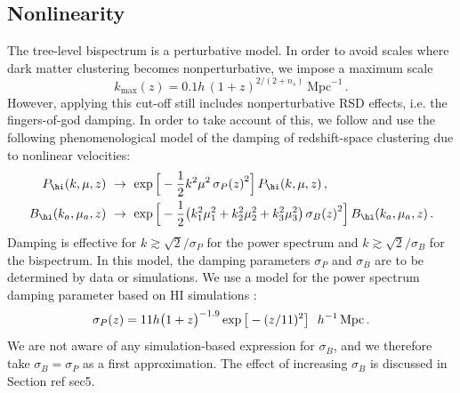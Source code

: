 \subsection{Nonlinearity}
%
The tree-level bispectrum is a perturbative model. In order to avoid scales where dark matter clustering becomes nonperturbative, we impose a maximum scale \cite{Maartens:2019yhx}
\begin{equation} \label{eq:snrkmax}
k_{\mathrm{max}}(z) = 0.1h\,(1+z)^{2/(2+n_s)}~\mathrm{Mpc}^{-1}\,.
\end{equation}
However, applying this cut-off still includes nonperturbative RSD effects, i.e. the fingers-of-god damping. In order to take account of this, we follow \cite{Karagiannis:2018jdt,Yankelevich:2018uaz,Maartens:2019yhx} and use the following phenomenological model of the damping of redshift-space clustering due to nonlinear velocities:
\begin{align}
 P_{\hi}(k,\mu,z) & ~\to~   \exp\Big[-\frac{1}{2}{k^2\mu^2\,{\sigma_{P}(z)}^{2}}\Big]\,P_{\hi}(k,\mu,z)
 \,, \label{e2.10}\\
 B_{\hi}(k_a,\mu_a,z) & ~\to~  \exp\Big[-\frac{1}{2}{\left( k_{1}^{2}\mu_{1}^{2}+k_{2}^{2}\mu_{2}^{2}+k_{3}^{2}\mu_{3}^{2}\right){\sigma_{B}(z)}^{2}}\Big]\,B_{\hi}(k_a,\mu_a,z)
 \,. \label{e2.11}
\end{align}
Damping is effective for $k\gtrsim \sqrt{2}/\sigma_P$ for the power spectrum and  $k\gtrsim \sqrt{2}/\sigma_B$ for the bispectrum.
In this model, the damping parameters $\sigma_P$ and $\sigma_B$ are  to be determined by data or simulations.
We use a model for the power spectrum damping parameter based on HI simulations \cite{Sarkar:2019ojl}:
\begin{equation}
\sigma_{P}(z) = 11h\big(1+z\big)^{-1.9}\exp{\big[-(z/11)^{2}\big]}~~h^{-1}\,\mathrm{Mpc}\,. \label{e2.12}  \\
\end{equation}
We are not aware of any simulation-based expression for $\sigma_B$, and we therefore take $\sigma_B=\sigma_P$ as a first approximation. The
effect of increasing $\sigma_B$ is discussed in Section ref sec5.

